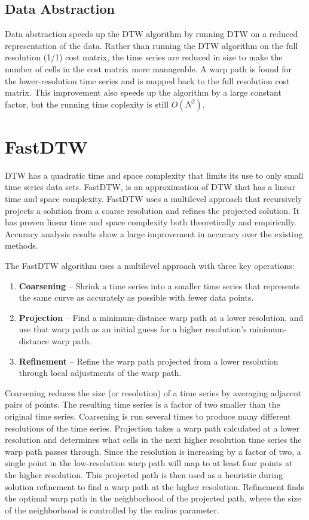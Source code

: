 \subsection{Data Abstraction}

Data abstraction speeds up the DTW algorithm by running DTW on a reduced representation of the data.
Rather than running the DTW algorithm on the full resolution (1/1) cost matrix, the time series are
reduced in size to make the number of cells in the cost matrix more manageable. A warp path is found
for the lower-resolution time series and is mapped back to the full resolution cost matrix. This
improvement also speeds up the algorithm by a large constant factor, but the running time coplexity
is still $O(N^2)$.

\section{FastDTW}

DTW has a quadratic time and space complexity that limits its use to only small time series data
sets. FastDTW, is an approximation of DTW that has a linear time and space complexity. FastDTW uses
a multilevel approach that recursively projects a solution from a coarse resolution and refines the
projected solution. It has proven linear time and space complexity both theoretically and
empirically. Accuracy analysis results show a large improvement in accuracy over the existing
methods. \cite{toward_accurate__dtw}

The FastDTW algorithm uses a multilevel approach with three key operations:
\begin{enumerate}
  \item \textbf{Coarsening} – Shrink a time series into a smaller time series that represents the
  same curve as accurately as possible with fewer data points.
  \item \textbf{Projection} – Find a minimum-distance warp path at a lower resolution, and use that
  warp path as an initial guess for a higher resolution’s minimum-distance warp path.
  \item \textbf{Refinement} – Refine the warp path projected from a lower resolution through local
  adjustments of the warp path.
\end{enumerate}

Coarsening reduces the size (or resolution) of a time series by averaging adjacent pairs of points.
The resulting time series is a factor of two smaller than the original time series. Coarsening is
run several times to produce many different resolutions of the time series. Projection takes a warp
path calculated at a lower resolution and determines what cells in the next higher resolution time
series the warp path passes through. Since the resolution is increasing by a factor of two, a single
point in the low-resolution warp path will map to at least four points at the higher resolution.
This projected path is then used as a heuristic during solution refinement to find a warp path at
the higher resolution. Refinement finds the optimal warp path in the neighborhood of the projected
path, where the size of the neighborhood is controlled by the radius parameter.
\cite{toward_accurate__dtw}

